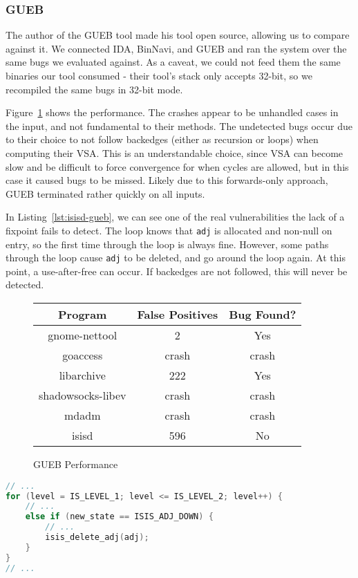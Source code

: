 \subsubsection{GUEB}
The author of the GUEB tool made his tool open source, allowing us to compare against it.
We connected IDA, BinNavi, and GUEB and ran the system over the same bugs we evaluated against.
As a caveat, we could not feed them the same binaries our tool consumed - their tool's stack only accepts 32-bit, so we recompiled the same bugs in 32-bit mode.

Figure~\ref{fig:guebperf} shows the performance.
The crashes appear to be unhandled cases in the input, and not fundamental to their methods.
The undetected bugs occur due to their choice to not follow backedges (either as recursion or loops) when computing their VSA.
This is an understandable choice, since VSA can become slow and be difficult to force convergence for when cycles are allowed, but in this case it caused bugs to be missed.
Likely due to this forwards-only approach, GUEB terminated rather quickly on all inputs.

In Listing~\ref{lst:isisd-gueb}, we can see one of the real vulnerabilities the lack of a fixpoint fails to detect.
The loop knows that \texttt{adj} is allocated and non-null on entry, so the first time through the loop is always fine.
However, some paths through the loop cause \texttt{adj} to be deleted, and go around the loop again.
At this point, a use-after-free can occur.
If backedges are not followed, this will never be detected.

\begin{figure}
\begin{center}
\begin{tabular}{|c||c|c|}
\hline
Program & False Positives & Bug Found? \\
\hline \hline
	gnome-nettool & 2 & Yes\\
	goaccess & crash & crash\\
	libarchive & 222 & Yes\\
	shadowsocks-libev & crash & crash\\
	mdadm & crash & crash\\
	isisd & 596 & No\\
\hline
\end{tabular}
\end{center}
\caption{GUEB Performance}
\label{fig:guebperf}
\end{figure}

\begin{lstlisting}[language=C, float=t, caption={\texttt{isisd} Vulnerability}, label=lst:isisd-gueb]
// ...
for (level = IS_LEVEL_1; level <= IS_LEVEL_2; level++) {
	// ...
	else if (new_state == ISIS_ADJ_DOWN) {
		// ...
		isis_delete_adj(adj);
	}
}
// ...
\end{lstlisting}



